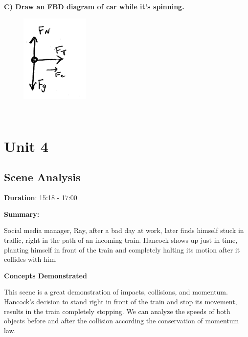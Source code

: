 \documentclass[a4paper,12pt]{article}
\begin{document}
\noindent\textbf{C) Draw an FBD diagram of car while it's spinning.} \\

\begin{figure}[H]
    \centering
    \includegraphics[width=0.3\textwidth]{U3_P2_C.jpg} %
\end{figure} 


\\




\newpage

\section{Unit 4}

\vspace{-0.5cm}
\singlespacing

\subsection{Scene Analysis}

\textbf{Duration}: 15:18 - 17:00

\vspace{0.3cm}
\noindent\textbf{Summary:} \par
Social media manager, Ray, after a bad day at work, later finds himself stuck in traffic, right in the path of an incoming train. Hancock shows up just in time, planting himself in front of the train and completely halting its motion after it collides with him.
\par


\vspace{0.3cm}
\noindent\textbf{Concepts Demonstrated} \par
This scene is a great demonstration of impacts, collisions, and momentum. Hancock's decision to stand right in front of the train and stop its movement, results in the train completely stopping. We can analyze the speeds of both objects before and after the collision according the conservation of momentum law.
\end{document}
